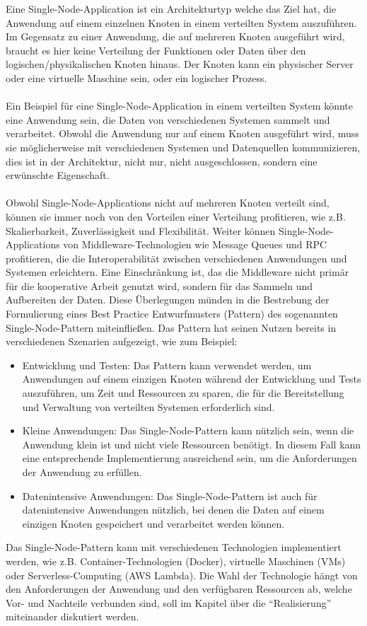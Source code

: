 \documentclass[../vs-script-first-v01.tex]{subfiles}
\begin{document}
Eine Single-Node-Application ist ein Architekturtyp welche das Ziel hat, die Anwendung auf einem einzelnen Knoten in einem verteilten System auszuführen. Im Gegensatz zu einer Anwendung, die auf mehreren Knoten ausgeführt wird, braucht es hier keine Verteilung der Funktionen oder Daten über den logischen/physikalischen Knoten hinaus. Der Knoten kann ein physischer Server oder eine virtuelle Maschine sein, oder ein logischer Prozess.
\\\\
Ein Beispiel für eine Single-Node-Application in einem verteilten System könnte eine Anwendung sein, die Daten von verschiedenen Systemen sammelt und verarbeitet. Obwohl die Anwendung nur auf einem Knoten ausgeführt wird, muss sie möglicherweise mit verschiedenen Systemen und Datenquellen kommunizieren, dies ist in der Architektur, nicht nur, nicht ausgeschlossen, sondern eine erwünschte Eigenschaft.
\\\\
Obwohl Single-Node-Applications nicht auf mehreren Knoten verteilt sind, können sie immer noch von den Vorteilen einer Verteilung profitieren, wie z.B. Skalierbarkeit, Zuverlässigkeit und Flexibilität. Weiter können
Single-Node-Applications von Middleware-Technologien wie Message Queues und RPC profitieren, die die Interoperabilität zwischen verschiedenen Anwendungen und Systemen erleichtern. Eine Einschränkung ist, das die Middleware nicht primär für die kooperative Arbeit genutzt wird, sondern für das Sammeln und Aufbereiten der Daten. Diese Überlegungen münden in die Bestrebung der Formulierung eines Best Practice Entwurfmusters (Pattern) des sogenannten Single-Node-Pattern miteinfließen. Das Pattern hat seinen Nutzen bereits in verschiedenen Szenarien aufgezeigt, wie zum Beispiel:
\begin{itemize}
\item Entwicklung und Testen: Das Pattern kann verwendet werden, um Anwendungen auf einem einzigen Knoten während der Entwicklung und Tests auszuführen, um Zeit und Ressourcen zu sparen, die für die Bereitstellung und Verwaltung von verteilten Systemen erforderlich sind.
\item Kleine Anwendungen: Das Single-Node-Pattern kann nützlich sein, wenn die Anwendung klein ist und nicht viele Ressourcen benötigt. In diesem Fall kann eine entsprechende Implementierung ausreichend sein, um die Anforderungen der Anwendung zu erfüllen.
\item Datenintensive Anwendungen: Das Single-Node-Pattern ist auch für datenintensive Anwendungen nützlich, bei denen die Daten auf einem einzigen Knoten gespeichert und verarbeitet werden können.
\end{itemize}
Das Single-Node-Pattern kann mit verschiedenen Technologien implementiert werden, wie z.B. Container-Technologien (Docker), virtuelle Maschinen (VMs) oder Serverless-Computing (AWS Lambda). Die Wahl der Technologie hängt von den Anforderungen der Anwendung und den verfügbaren Ressourcen ab, welche Vor- und Nachteile verbunden sind, soll im Kapitel über die \enquote{Realisierung} miteinander diskutiert werden. 
\end{document}
